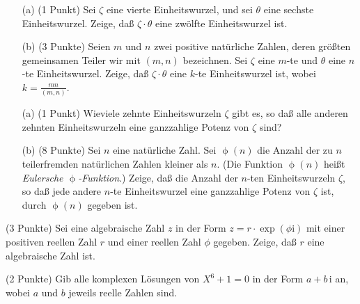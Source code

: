 \documentclass{algsheet}
\begin{document}
\begin{exercise}
\begin{enumerate}
    \item[(a)](1 Punkt)\newline
    Sei \(\zeta\) eine vierte Einheitswurzel, und sei \(\theta\) eine sechste
    Einheitswurzel. Zeige, daß \(\zeta \cdot \theta\) eine zwölfte Einheitswurzel
    ist.


 \item[(b)]  (3 Punkte)\newline
    Seien \(m\) und \(n\) zwei positive natürliche Zahlen, deren größten
    gemeinsamen Teiler wir mit \((m, n)\) bezeichnen. Sei \(\zeta\) eine
    \(m\)-te und \(\theta\) eine \(n\)-te Einheitswurzel. Zeige, daß
    \(\zeta \cdot \theta\) eine \(k\)-te Einheitswurzel ist, wobei
    \(k = \frac{m n}{(m, n)}\).
\end{enumerate}
\end{exercise}

\begin{exercise}
 \begin{enumerate}
 \item[(a)](1 Punkt)\newline
    Wieviele zehnte Einheitswurzeln \(\zeta\) gibt es, so daß alle
    anderen zehnten Einheitswurzeln eine ganzzahlige Potenz von \(\zeta\)
    sind?


\item[(b)](8 Punkte)\newline
    Sei \(n\) eine natürliche Zahl. Sei \(\upphi(n)\) die Anzahl der zu
    \(n\) teilerfremden natürlichen Zahlen kleiner als \(n\). (Die Funktion
    \(\upphi(n)\) heißt \emph{Eulersche \(\upphi\)-Funktion}.) Zeige, daß die
    Anzahl der \(n\)-ten Einheitswurzeln \(\zeta\), so daß jede andere
    \(n\)-te Einheitswurzel eine ganzzahlige Potenz von \(\zeta\) ist, durch
    \(\upphi(n)\) gegeben ist.
\end{enumerate}
\end{exercise}


\begin{exercise}(3 Punkte)\newline
    Sei eine algebraische Zahl \(z\) in der Form
    \(z = r \cdot \exp({\phi \mathrm i})\) mit einer positiven reellen Zahl \(r\) und
    einer reellen Zahl \(\phi\) gegeben. Zeige, daß \(r\) eine algebraische
    Zahl ist.
\end{exercise}

\begin{exercise}(2 Punkte)\newline
    Gib alle komplexen Lösungen von \(X^6 + 1 = 0\) in der Form \(a + b \, \mathrm i\)
    an, wobei \(a\) und \(b\) jeweils reelle Zahlen sind.
\end{exercise}
\end{document}
